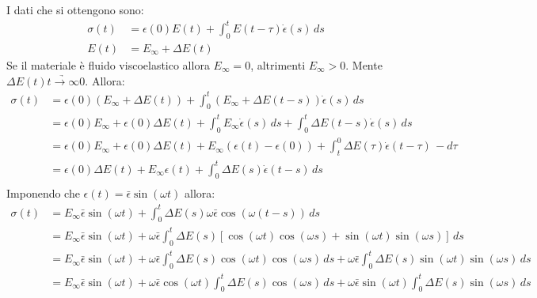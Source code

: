 I dati che si ottengono sono:
\begin{equation}
\begin{split}
\sigma(t) &= \epsilon(0)E(t) + \int_0^t{E(t-\tau)\dot{\epsilon}(s)\,ds}\\
E(t) &= E_{\infty} + \Delta E(t)
\end{split}
\end{equation}
Se il materiale è fluido viscoelastico allora $E_{\infty} = 0$, altrimenti $E_{\infty} > 0$.
Mente $\Delta E(t) \underrightarrow{t \rightarrow \infty} 0$.
Allora:
\begin{equation}
\begin{split}
\sigma(t) &= \epsilon(0)(E_{\infty} + \Delta E(t)) + \int_0^t{(E_{\infty} + \Delta E(t-s)) \dot{\epsilon}(s)\,ds}\\
&= \epsilon(0)E_{\infty} + \epsilon(0)\Delta E(t) + \int_0^t{E_{\infty}\dot{\epsilon}(s)\,ds} +  \int_0^t{\Delta E(t-s) \dot{\epsilon}(s)\,ds}\\
&= \epsilon(0)E_{\infty} + \epsilon(0)\Delta E(t) + E_{\infty}(\epsilon(t) - \epsilon(0)) + \int_t^0{\Delta E(\tau) \dot{\epsilon}(t-\tau)\,-d\tau}\\
&= \epsilon(0)\Delta E(t) + E_{\infty}\epsilon(t) + \int_0^t{\Delta E(s) \dot{\epsilon}(t-s)\,ds}\\
\end{split}
\end{equation}
Imponendo che $\epsilon(t) = \bar{\epsilon}\sin(\omega t)$ allora:
\begin{equation}
\begin{split}
\sigma(t) &= E_{\infty} \bar{\epsilon}\sin(\omega t) + \int_0^t{\Delta E(s)\omega\bar{\epsilon}\cos(\omega(t-s))\,ds}\\
&= E_{\infty} \bar{\epsilon}\sin(\omega t) + \omega\bar{\epsilon}\int_0^t{\Delta E(s) \left[\cos(\omega t)\cos(\omega s) + \sin(\omega t)\sin(\omega s)\right]\,ds}\\
&= E_{\infty} \bar{\epsilon}\sin(\omega t) + \omega\bar{\epsilon}\int_0^t{\Delta E(s) \cos(\omega t)\cos(\omega s)\,ds} + \omega\bar{\epsilon}\int_0^t{\Delta E(s)\sin(\omega t)\sin(\omega s)\,ds}\\
&= E_{\infty} \bar{\epsilon}\sin(\omega t) + \omega\bar{\epsilon}\cos(\omega t)\int_0^t{\Delta E(s) \cos(\omega s)\,ds} + \omega\bar{\epsilon}\sin(\omega t)\int_0^t{\Delta E(s)\sin(\omega s)\,ds}\\
\end{split}
\end{equation}